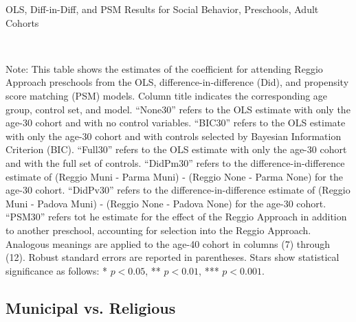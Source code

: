 \begin{landscape}
\begin{table}[H] \caption{OLS, Diff-in-Diff, and PSM Results for Social Behavior, Preschools, Adult Cohorts} \label{ols-S-reg}
\scalebox{0.80}{
}
\vspace{1ex} \\
\footnotesize\raggedright{Note: This table shows the estimates of the coefficient for attending Reggio Approach preschools from the OLS, difference-in-difference (Did), and propensity score matching (PSM) models. Column title indicates the corresponding age group, control set, and model. ``None30'' refers to the OLS estimate with only the age-30 cohort and with no control variables. ``BIC30'' refers to the OLS estimate with only the age-30 cohort and with controls selected by Bayesian Information Criterion (BIC). ``Full30'' refers to the OLS estimate with only the age-30 cohort and with the full set of controls. ``DidPm30'' refers to the difference-in-difference estimate of (Reggio Muni - Parma Muni) - (Reggio None - Parma None) for the age-30 cohort. ``DidPv30'' refers to the difference-in-difference estimate of (Reggio Muni - Padova Muni) - (Reggio None - Padova None) for the age-30 cohort. ``PSM30'' refers tot he estimate for the effect of the Reggio Approach in addition to another preschool, accounting for selection into the Reggio Approach. Analogous meanings are applied to the age-40 cohort in columns (7) through (12). Robust standard errors are reported in parentheses. Stars show statistical significance as follows: * $p < 0.05$, ** $p < 0.01$, *** $p < 0.001$.}
\end{table}









\subsection{Municipal vs. Religious}\label{appendix:religious}

\end{landscape}
